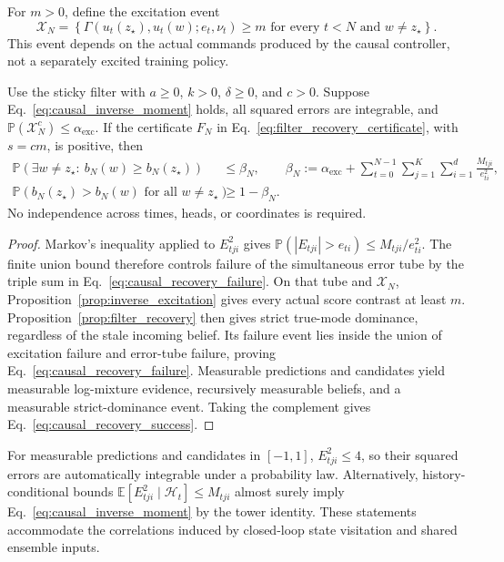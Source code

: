 For $m>0$, define the excitation event
\begin{equation}
 \mathcal X_N=\left\{
 \Gamma(u_t(z_\star),u_t(w);e_t,\nu_t)\ge m
 \text{ for every }t<N\text{ and }w\ne z_\star
 \right\}.
 \label{eq:causal_excitation_event}
\end{equation}
This event depends on the actual commands produced by the causal controller, not a separately excited training policy.

\begin{theorem}
\label{thm:recovery_probability}
Use the sticky filter with $a\ge0$, $k>0$, $\delta\ge0$, and $c>0$.
Suppose Eq.~\eqref{eq:causal_inverse_moment} holds, all squared errors are integrable, and
$\mathbb P(\mathcal X_N^c)\le\alpha_{\mathrm{exc}}$.
If the certificate $F_N$ in Eq.~\eqref{eq:filter_recovery_certificate}, with $s=cm$, is positive, then
\begin{align}
 \mathbb P\!\left(\exists w\ne z_\star:\ b_N(w)\ge b_N(z_\star)\right)
 &\le \beta_N,\qquad
 \beta_N:=\alpha_{\mathrm{exc}}+
 \sum_{t=0}^{N-1}\sum_{j=1}^{K}\sum_{i=1}^{d}\frac{M_{tji}}{e_{ti}^2},
 \label{eq:causal_recovery_failure}\\
 \mathbb P\!\left(b_N(z_\star)>b_N(w)\text{ for all }w\ne z_\star\right)
 &\ge 1-\beta_N.
 \label{eq:causal_recovery_success}
\end{align}
No independence across times, heads, or coordinates is required.
\end{theorem}

\begin{proof}
Markov's inequality applied to $E_{tji}^2$ gives
$\mathbb P(|E_{tji}|>e_{ti})\le M_{tji}/e_{ti}^2$.
The finite union bound therefore controls failure of the simultaneous error tube by the triple sum in Eq.~\eqref{eq:causal_recovery_failure}.
On that tube and $\mathcal X_N$, Proposition~\ref{prop:inverse_excitation} gives every actual score contrast at least $m$.
Proposition~\ref{prop:filter_recovery} then gives strict true-mode dominance, regardless of the stale incoming belief.
Its failure event lies inside the union of excitation failure and error-tube failure, proving Eq.~\eqref{eq:causal_recovery_failure}.
Measurable predictions and candidates yield measurable log-mixture evidence, recursively measurable beliefs, and a measurable strict-dominance event.
Taking the complement gives Eq.~\eqref{eq:causal_recovery_success}.
\end{proof}

For measurable predictions and candidates in $[-1,1]$, $E_{tji}^2\le4$, so their squared errors are automatically integrable under a probability law.
Alternatively, history-conditional bounds $\mathbb E[E_{tji}^2\mid\mathcal H_t]\le M_{tji}$ almost surely imply Eq.~\eqref{eq:causal_inverse_moment} by the tower identity.
These statements accommodate the correlations induced by closed-loop state visitation and shared ensemble inputs.

